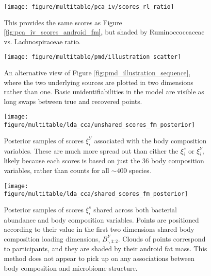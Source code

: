 \begin{figure}
  \centering
  \texttt{[image: figure/multitable/pca\_iv/scores\_rl\_ratio]}
  \caption{This provides the same scores as Figure
    \ref{fig:pca_iv_scores_android_fm}, but shaded by Ruminoccoccaceae vs.
    Lachnospiraceae ratio. \label{fig:pca_iv_scores_rl_ratio} }
\end{figure}

\begin{figure}
  \centering
  \texttt{[image: figure/multitable/pmd/illustration\_scatter]}
  \caption{An alternative view of Figure \ref{fig:pmd_illustration_sequence},
    where the two underlying sources are plotted in two dimensions rather than
    one. Basic unidentifiabilities in the model are visible as long swaps
    between true and recovered points. \label{fig:pmd_illustration_scatter} }
\end{figure}

 \begin{figure}
   \centering
   \texttt{[image: figure/multitable/lda\_cca/unshared\_scores\_fm\_posterior]}
   \caption{Posterior samples of scores $\xi^{Y}_i$ associated with the body
     composition variables. These are much more spread out than either the
     $\xi_{i}^s$ or $\xi_{i}^Y$, likely because each scores is based on just the
     36 body composition variables, rather than counts for all $\sim 400$
     species.
     \label{fig:lda_cca_unshared_scores_fm_posterior} }
 \end{figure}

 \begin{figure}
   \centering
   \texttt{[image: figure/multitable/lda\_cca/shared\_scores\_fm\_posterior]}
   \caption{Posterior samples of scores $\xi^{s}_i$ shared across both bacterial
     abundance and body composition variables. Points are positioned according
     to their value in the first two dimensions shared body composition loading
     dimensions, $B^{Y}_{\cdot, 1:2}$. Clouds of points correspond to
     participants, and they are shaded by their android fat mass. This method
     does not appear to pick up on any associations between body composition and
     microbiome structure.
 \label{fig:lda_cca_shared_scores_fm_posterior} }
 \end{figure}

